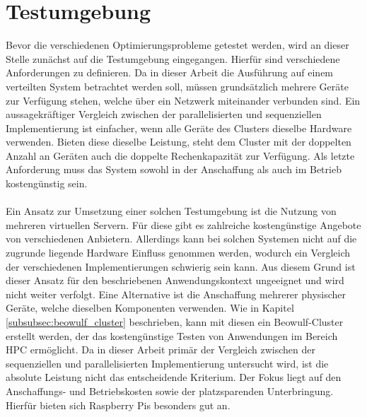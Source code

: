 \section{Testumgebung}
\label{sec:analysis_testsetup}
Bevor die verschiedenen Optimierungsprobleme getestet werden, wird an dieser Stelle zunächst auf die Testumgebung eingegangen. Hierfür sind verschiedene Anforderungen zu definieren. Da in dieser Arbeit die Ausführung auf einem verteilten System betrachtet werden soll, müssen grundsätzlich mehrere Geräte zur Verfügung stehen, welche über ein Netzwerk miteinander verbunden sind. Ein aussagekräftiger Vergleich zwischen der parallelisierten und sequenziellen Implementierung ist einfacher, wenn alle Geräte des Clusters dieselbe Hardware verwenden. Bieten diese dieselbe Leistung, steht dem Cluster mit der doppelten Anzahl an Geräten auch die doppelte Rechenkapazität zur Verfügung. Als letzte Anforderung muss das System sowohl in der Anschaffung als auch im Betrieb kostengünstig sein.
\\\\
Ein Ansatz zur Umsetzung einer solchen Testumgebung ist die Nutzung von mehreren virtuellen Servern. Für diese gibt es zahlreiche kostengünstige Angebote von verschiedenen Anbietern. Allerdings kann bei solchen Systemen nicht auf die zugrunde liegende Hardware Einfluss genommen werden, wodurch ein Vergleich der verschiedenen Implementierungen schwierig sein kann. Aus diesem Grund ist dieser Ansatz für den beschriebenen Anwendungskontext ungeeignet und wird nicht weiter verfolgt. Eine Alternative ist die Anschaffung mehrerer physischer Geräte, welche dieselben Komponenten verwenden. Wie in Kapitel \ref{subsubsec:beowulf_cluster} beschrieben, kann mit diesen ein Beowulf-Cluster erstellt werden, der das kostengünstige Testen von Anwendungen im Bereich \ac{HPC} ermöglicht. Da in dieser Arbeit primär der Vergleich zwischen der sequenziellen und parallelisierten Implementierung untersucht wird, ist die absolute Leistung nicht das entscheidende Kriterium. Der Fokus liegt auf den Anschaffungs- und Betriebskosten sowie der platzsparenden Unterbringung. Hierfür bieten sich Raspberry Pis besonders gut an.  
\\\\
